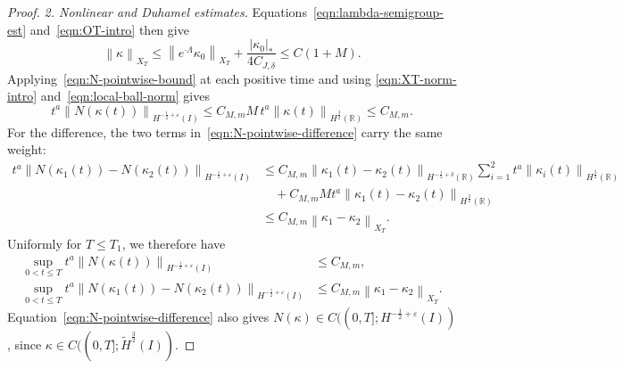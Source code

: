\documentclass[10pt,a4paper]{amsart}
\newcommand{\R}{\mathbb{R}}
\newcommand{\abs}[1]{\left\lvert #1 \right\rvert}
\newcommand{\hi}[1]{H^{#1}(I)}
\newcommand{\hr}[1]{H^{#1}(\R)}
\newcommand{\norm}[1]{\left\lVert #1 \right\rVert}
\newcommand{\thi}[1]{\wt H^{#1}(I)}
\newcommand{\wt}[1]{\widetilde{#1}}
\begin{document}
\begin{proof}
\emph{2. Nonlinear and Duhamel estimates.}
Equations~\eqref{eqn:lambda-semigroup-est} and~\eqref{eqn:OT-intro} then give
\begin{equation}\label{eqn:local-ball-norm}
    \norm{\kappa}_{X_T}
    \le \norm{e^{\cdot\Lambda}\kappa_0}_{X_T}
       +\frac{\abs{\kappa_0}_*}{4C_{J,\delta}}
    \le C(1+M).
\end{equation}
Applying~\eqref{eqn:N-pointwise-bound} at each positive time and using
\eqref{eqn:XT-norm-intro} and~\eqref{eqn:local-ball-norm} gives
\begin{equation*}
    t^a\norm{N(\kappa(t))}_{\hi{-\frac12+\varepsilon}}
    \le C_{M,m}M\,t^a\norm{\kappa(t)}_{\hr{\frac32}}
    \le C_{M,m}.
\end{equation*}
For the difference, the two terms in~\eqref{eqn:N-pointwise-difference}
carry the same weight:
\begin{equation*}
\begin{aligned}
    t^a\norm{N(\kappa_1(t))-N(\kappa_2(t))}_{\hi{-\frac12+\varepsilon}}
    &\le C_{M,m}\norm{\kappa_1(t)-\kappa_2(t)}_{\hr{-\frac12+\delta}}
        \sum_{i=1}^2 t^a\norm{\kappa_i(t)}_{\hr{\frac32}}\\
    &\quad+C_{M,m}M t^a
        \norm{\kappa_1(t)-\kappa_2(t)}_{\hr{\frac32}}\\
    &\le C_{M,m}\norm{\kappa_1-\kappa_2}_{X_T}.
\end{aligned}
\end{equation*}
Uniformly for $T\le T_1$, we therefore have
\begin{equation}\label{eqn:local-nonlinear-bounds}
\begin{aligned}
    \sup_{0<t\le T}t^a
    \norm{N(\kappa(t))}_{\hi{-\frac12+\varepsilon}}
    &\le C_{M,m},\\
    \sup_{0<t\le T}t^a
    \norm{N(\kappa_1(t))-N(\kappa_2(t))}_{\hi{-\frac12+\varepsilon}}
    &\le C_{M,m}\norm{\kappa_1-\kappa_2}_{X_T}.
\end{aligned}
\end{equation}
Equation~\eqref{eqn:N-pointwise-difference} also gives
$N(\kappa)\in C((0,T];\hi{-\frac12+\varepsilon})$, since
$\kappa\in C((0,T];\thi{\frac32})$.


\end{proof}
\end{document}
